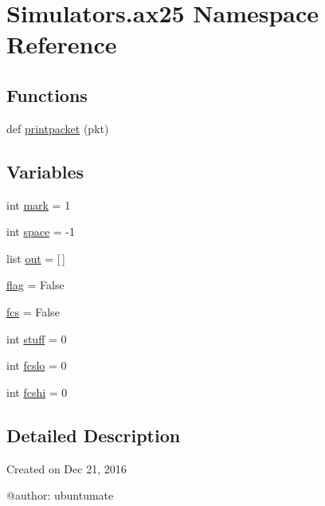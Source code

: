 \hypertarget{namespace_simulators_1_1ax25}{}\section{Simulators.\+ax25 Namespace Reference}
\label{namespace_simulators_1_1ax25}
\subsection*{Functions}
\begin{DoxyCompactItemize}
\item 
def \hyperlink{namespace_simulators_1_1ax25_a0194594173e1269c6825f20cabccf77b}{printpacket} (pkt)
\end{DoxyCompactItemize}
\subsection*{Variables}
\begin{DoxyCompactItemize}
\item 
int \hyperlink{namespace_simulators_1_1ax25_a0f38975651a261e0d51a50b0ed79caaa}{mark} = 1
\item 
int \hyperlink{namespace_simulators_1_1ax25_a62d8cdc4e9b178f6c1b1fc312c90c729}{space} = -\/1
\item 
list \hyperlink{namespace_simulators_1_1ax25_a84faca1a8ba1c72b74614385ffb88145}{out} = \mbox{[}$\,$\mbox{]}
\item 
\hyperlink{namespace_simulators_1_1ax25_a9aa5e370ccb543662ae555b94a1d29cf}{flag} = False
\item 
\hyperlink{namespace_simulators_1_1ax25_a0d33d6984f8148eb276872486de0b05b}{fcs} = False
\item 
int \hyperlink{namespace_simulators_1_1ax25_a5b4f94684090625dbe3a824ecb3c4027}{stuff} = 0
\item 
int \hyperlink{namespace_simulators_1_1ax25_a7603c9c21b666235c0dd731b7e03e1f9}{fcslo} = 0
\item 
int \hyperlink{namespace_simulators_1_1ax25_a8c79eb35e1012855048cbb33575b45ef}{fcshi} = 0
\end{DoxyCompactItemize}


\subsection{Detailed Description}
\begin{DoxyVerb}Created on Dec 21, 2016

@author: ubuntumate
\end{DoxyVerb}
 

